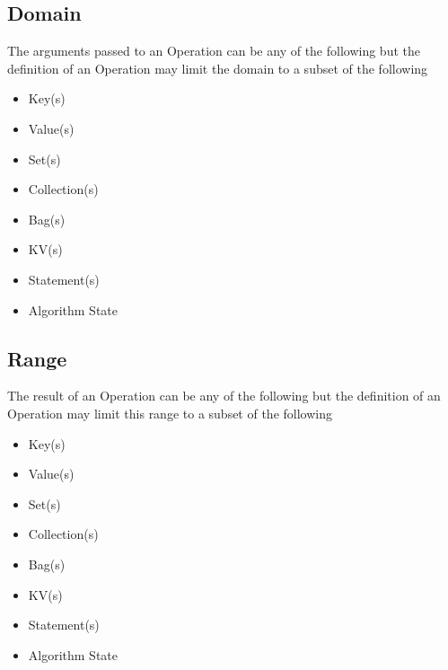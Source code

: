 \documentclass[../main.tex]{subfiles}
\begin{document}
\subsection{Domain}
The arguments passed to an Operation can be any of the following but the definition of an Operation may limit the domain to a subset of the following
\begin{itemize}
\item Key(s)
\item Value(s)
\item Set(s)
\item Collection(s)
\item Bag(s)
\item KV(s)
\item Statement(s)
\item Algorithm State
\end{itemize}

\subsection{Range}
The result of an Operation can be any of the following but the definition of an Operation may limit this range to a subset of the following

\begin{itemize}
\item Key(s)
\item Value(s)
\item Set(s)
\item Collection(s)
\item Bag(s)
\item KV(s)
\item Statement(s)
\item Algorithm State
\end{itemize}
\end{document}
